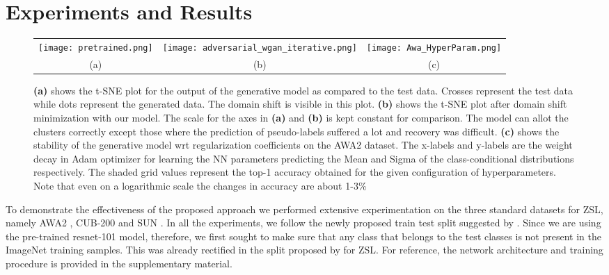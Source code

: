 \documentclass[10pt,twocolumn,letterpaper]{article}
\begin{document}
\section{Experiments and Results}
\label{sec:model}
\begin{figure*}[t]
    \centering
    \begin{tabular}{ccc}
        \texttt{[image: pretrained.png]} &
    \texttt{[image: adversarial\_wgan\_iterative.png]} &
    \texttt{[image: Awa\_HyperParam.png]}\\
    (a) & (b) &(c)
    \end{tabular}

    \caption{\textbf{(a)} shows the t-SNE plot for the output of the generative model as compared to the test data. Crosses represent the test data while dots represent the generated data. The domain shift is visible in this plot. \textbf{(b)} shows the t-SNE plot after domain shift minimization with our model. The scale for the axes in \textbf{(a)} and \textbf{(b)} is kept constant for comparison. The model can allot the clusters correctly except those where the prediction of pseudo-labels suffered a lot and recovery was difficult. \textbf{(c)} shows the stability of the generative model wrt regularization coefficients on the AWA2 dataset. The x-labels and y-labels are the weight decay in Adam optimizer for learning the NN parameters predicting the Mean and Sigma of the class-conditional distributions respectively. The shaded grid values represent the top-1 accuracy obtained for the given configuration of hyperparameters. Note that even on a logarithmic scale the changes in accuracy are about 1-3\%}
    \label{fig:Clustering}
\end{figure*}
To demonstrate the effectiveness of the proposed approach we performed extensive experimentation on the three standard datasets for ZSL, namely AWA2 \cite{xian2018zero}, CUB-200 \cite{welinder2010caltech} and SUN \cite{xiao2010sun}. In all the experiments, we follow the newly proposed train test split suggested by \cite{xian2018zero}. Since we are using the pre-trained resnet-101 model, therefore, we first sought to make sure that any class that belongs to the test classes is not present in the ImageNet \cite{imagenet2015} training samples. This was already rectified in the split proposed by \cite{xian2018zero} for ZSL. For reference, the network architecture and training procedure is provided in the supplementary material.
\end{document}
